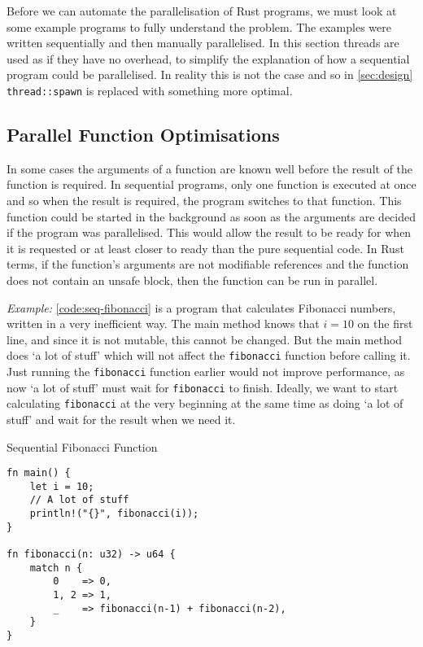 \documentclass[conference]{IEEEtran}
\begin{document}
Before we can automate the parallelisation of Rust programs, we must look at some example programs to fully understand the problem. The examples were written sequentially and then manually parallelised. In this section threads are used as if they have no overhead, to simplify the explanation of how a sequential program could be parallelised. In reality this is not the case and so in \autoref{sec:design} \texttt{thread::spawn} is replaced with something more optimal.

\subsection{Parallel Function Optimisations}
In some cases the arguments of a function are known well before the result of the function is required. In sequential programs, only one function is executed at once and so when the result is required, the program switches to that function. This function could be started in the background as soon as the arguments are decided if the program was parallelised. This would allow the result to be ready for when it is requested or at least closer to ready than the pure sequential code.
In Rust terms, if the function's arguments are not modifiable references and the function does not contain an unsafe block, then the function can be run in parallel.

\textit{Example:}
\autoref{code:seq-fibonacci} is a program that calculates Fibonacci numbers, written in a very inefficient way. The main method knows that $i = 10$ on the first line, and since it is not mutable, this cannot be changed. But the main method does `a lot of stuff' which will not affect the \texttt{fibonacci} function before calling it. Just running the \texttt{fibonacci} function earlier would not improve performance, as now `a lot of stuff' must wait for \texttt{fibonacci} to finish. Ideally, we want to start calculating \texttt{fibonacci} at the very beginning at the same time as doing `a lot of stuff' and wait for the result when we need it.

\begin{algorithm}
\caption{Sequential Fibonacci Function}
\label{code:seq-fibonacci}
\begin{verbatim}
fn main() {
    let i = 10;
    // A lot of stuff
    println!("{}", fibonacci(i));
}

fn fibonacci(n: u32) -> u64 {
    match n {
        0    => 0,
        1, 2 => 1,
        _    => fibonacci(n-1) + fibonacci(n-2),
    }
}
\end{verbatim}
\end{algorithm}
\end{document}
